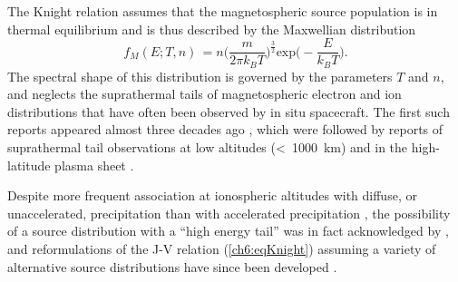   The Knight relation assumes that the magnetospheric source
  population is in thermal equilibrium and is thus described by the
  Maxwellian distribution
  \begin{equation} \label{ch6:eqMax1D} f_{M}( E ; T, n) \, = n \Big (
    \dfrac{m}{2 \pi k_{B} T} \Big )^{\frac{3}{2}} \textrm{exp} \Big (
    - \dfrac{E}{ k_B T } \Big ).
  \end{equation}
  The spectral shape of this distribution is governed by the
  parameters $T$ and $n$, and neglects the suprathermal tails of
  magnetospheric electron and ion distributions that have often been
  observed by in situ spacecraft. The first such reports appeared
  almost three decades ago \citep{Christon1989,Christon1991}, which
  were followed by reports of suprathermal tail observations at low
  altitudes (<~1000~km) and in the high-latitude plasma sheet
  \citep{Wing1998,Kletzing2003}.

  Despite more frequent association at ionospheric altitudes with
  diffuse, or unaccelerated, precipitation than with accelerated
  precipitation \citep[see, e.g., ][]{Newell2009,McIntosh2014}, the
  possibility of a source distribution with a ``high energy tail'' was
  in fact acknowledged by \citet{Knight1973}, and reformulations of
  the J-V relation (\ref{ch6:eqKnight}) assuming a variety of
  alternative source distributions have since been developed
  \citep{Pierrard1996,Janhunen1998,Dors1999,Bostrom2003a,Bostrom2004}.

